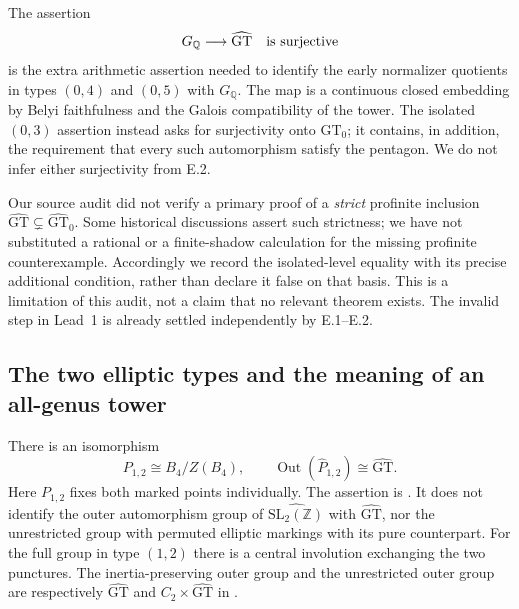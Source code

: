 The assertion
\[
 G_{\mathbb Q}\longrightarrow\widehat{\mathrm{GT}}
       \quad\hbox{is surjective}
\]
is the extra arithmetic assertion needed to identify the early normalizer
quotients in types $(0,4)$ and $(0,5)$ with $G_{\mathbb Q}$.
The map is a continuous closed embedding by Belyi faithfulness and the
Galois compatibility of the tower.  The isolated $(0,3)$ assertion instead
asks for surjectivity onto $\widehat{\mathrm{GT}}_0$; it contains, in
addition, the requirement that every such automorphism satisfy the
pentagon.  We do not infer either surjectivity from E.2.

Our source audit did not verify a primary proof of a \emph{strict}
profinite inclusion $\widehat{\mathrm{GT}}\subsetneq
\widehat{\mathrm{GT}}_0$.  Some historical discussions assert such
strictness; we have not substituted a rational or a finite-shadow
calculation for the missing profinite counterexample.  Accordingly we
record the isolated-level equality with its precise additional condition,
rather than declare it false on that basis.  This is a limitation of this
audit, not a claim that no relevant theorem exists.  The invalid step in
Lead~1 is already settled independently by E.1--E.2.

\subsection{The two elliptic types and the meaning of an all-genus tower}

There is an isomorphism
\[
 P_{1,2}\cong B_4/Z(B_4),\qquad
 \operatorname{Out}(\widehat P_{1,2})\cong\widehat{\mathrm{GT}}.
\]
Here $P_{1,2}$ fixes both marked points individually.  The assertion is
\citet[Theorem~B, Theorem~4.3 and Corollary~C]{MinamideNakamura2022}.
It does not identify the outer automorphism group of
$\widehat{\mathrm{SL}_2(\mathbb Z)}$ with
$\widehat{\mathrm{GT}}$, nor the unrestricted group with permuted
elliptic markings with its pure counterpart.  For the full group in type
$(1,2)$ there is a central involution exchanging the two punctures.
The inertia-preserving outer group and the unrestricted outer group are
respectively $\widehat{\mathrm{GT}}$ and
$C_2\times\widehat{\mathrm{GT}}$ in
\citet[Proposition~3.9]{Boggi2026Automorphisms}.

